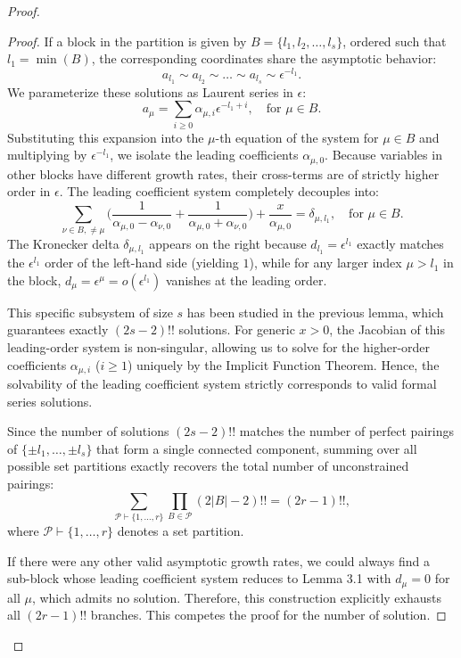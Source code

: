 \documentclass[11pt]{amsart}
\theoremstyle{remark}
\numberwithin{equation}{section}
\begin{document}
\begin{proof}
\begin{proof}
If a block in the partition is given by $B = \{l_1, l_2, \dots, l_s\}$, ordered such that $l_1 = \min(B)$, the corresponding coordinates share the asymptotic behavior:
\[
    a_{l_1} \sim a_{l_2} \sim \dots \sim a_{l_s} \sim \epsilon^{-l_1}.
\]
We parameterize these solutions as Laurent series in $\epsilon$:
\[
    a_{\mu} = \sum_{i \geq 0} \alpha_{\mu, i} \epsilon^{-l_1+i}, \quad \text{for } \mu \in B.
\]
Substituting this expansion into the $\mu$-th equation of the system for $\mu \in B$ and multiplying by $\epsilon^{-l_1}$, we isolate the leading coefficients $\alpha_{\mu, 0}$. Because variables in other blocks have different growth rates, their cross-terms are of strictly higher order in $\epsilon$. The leading coefficient system completely decouples into:
\[
    \sum_{\nu \in B, \neq \mu} \Big( \frac{1}{\alpha_{\mu, 0} - \alpha_{\nu, 0}} + \frac{1}{\alpha_{\mu, 0} + \alpha_{\nu, 0}} \Big) + \frac{x}{\alpha_{\mu, 0}} = \delta_{\mu, l_1}, \quad \text{for } \mu \in B.
\]
The Kronecker delta $\delta_{\mu, l_1}$ appears on the right because $d_{l_1} = \epsilon^{l_1}$ exactly matches the $\epsilon^{l_1}$ order of the left-hand side (yielding $1$), while for any larger index $\mu > l_1$ in the block, $d_\mu = \epsilon^\mu = o(\epsilon^{l_1})$ vanishes at the leading order.

This specific subsystem of size $s$ has been studied in the previous lemma, which guarantees exactly $(2s-2)!!$ solutions. For generic $x > 0$, the Jacobian of this leading-order system is non-singular, allowing us to solve for the higher-order coefficients $\alpha_{\mu, i}$ ($i \ge 1$) uniquely by the Implicit Function Theorem. Hence, the solvability of the leading coefficient system strictly corresponds to valid formal series solutions.

Since the number of solutions $(2s-2)!!$ matches the number of perfect pairings of $\{\pm l_1, \dots, \pm l_s\}$ that form a single connected component, summing over all possible set partitions exactly recovers the total number of unconstrained pairings:
\[
    \sum_{\mathcal{P} \vdash \{1, \dots, r\}} \prod_{B \in \mathcal{P}} (2|B|-2)!! = (2r-1)!!,
\]
where $\mathcal{P} \vdash \{1, \dots, r\}$ denotes a set partition.

If there were any other valid asymptotic growth rates, we could always find a sub-block whose leading coefficient system reduces to Lemma 3.1 with $d_\mu = 0$ for all $\mu$, which admits no solution. Therefore, this construction explicitly exhausts all $(2r-1)!!$ branches. This competes the proof for the number of solution.


\end{proof}
\end{proof}
\end{document}
